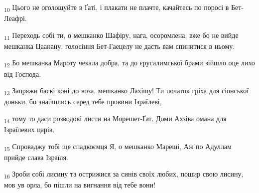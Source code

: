 \begin{tcolorbox}
\textsubscript{10} Цього не оголошуйте в Ґаті, і плакати не плачте, качайтесь по поросі в Бет-Леафрі.
\end{tcolorbox}
\begin{tcolorbox}
\textsubscript{11} Переходь собі ти, о мешканко Шафіру, нага, осоромлена, вже бо не вийде мешканка Цаанану, голосіння Бет-Гаецелу не дасть вам спинитися в ньому.
\end{tcolorbox}
\begin{tcolorbox}
\textsubscript{12} Бо мешканка Мароту чекала добра, та до єрусалимської брами зійшло оце лихо від Господа.
\end{tcolorbox}
\begin{tcolorbox}
\textsubscript{13} Запряжи баскі коні до воза, мешканко Лахішу! Ти початок гріха для сіонської доньки, бо знайшлись серед тебе провини Ізраїлеві,
\end{tcolorbox}
\begin{tcolorbox}
\textsubscript{14} тому то даси розводові листи на Морешет-Ґат. Доми Ахзіва омана для Ізраїлевих царів.
\end{tcolorbox}
\begin{tcolorbox}
\textsubscript{15} Спроваджу тобі ще спадкоємця Я, о мешканко Мареші, Аж по Адуллам прийде слава Ізраїля.
\end{tcolorbox}
\begin{tcolorbox}
\textsubscript{16} Зроби собі лисину та острижися за синів своїх любих, пошир свою лисину, мов ув орла, бо пішли на вигнання від тебе вони!
\end{tcolorbox}
